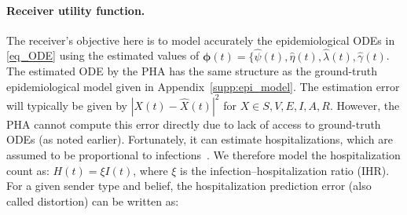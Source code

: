 \documentclass[sigconf,review]{acmart}
\newcommand{\abs}[1]{\left| #1 \right|}
\begin{document}


\paragraph{Receiver utility function.}
The receiver's objective here is to model accurately the epidemiological ODEs in \eqref{eq_ODE} using the estimated values of $\boldsymbol{\phi}(t) = \{\widehat{\psi}(t), \widehat{\eta}(t), \widehat{\lambda}(t), \widehat{\gamma}(t)$. The estimated ODE by the PHA has the same structure as the ground-truth epidemiological model given in Appendix~\ref{supp:epi_model}. The estimation error will typically be given by $\abs{X(t) - \widehat{X}(t)}^2$ for $X \in {S,V,E,I,A,R}$. However, the PHA cannot compute this error directly due to lack of access to ground-truth ODEs (as noted earlier). Fortunately, it can estimate hospitalizations, which are assumed to be proportional to infections~\cite{FoxPNAS2022}. We therefore model the hospitalization count as:
$H(t) = \xi I(t)$,
where $\xi$ is the infection–hospitalization ratio (IHR).
For a given sender type and belief,  the hospitalization prediction error (also called distortion) can be written as:
\end{document}
